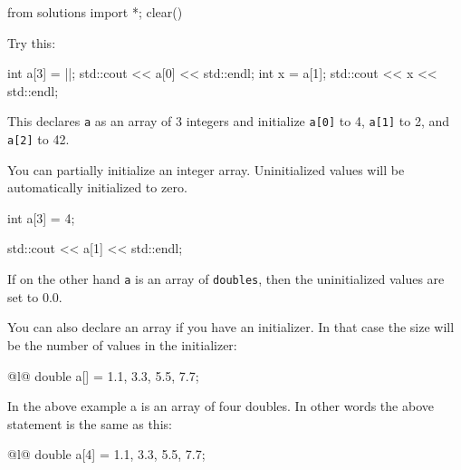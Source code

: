 \begin{python0}
from solutions import *; clear()
\end{python0}

Try this:

\begin{consolethree}[escapeinside=||]
int a[3] = ||;
std::cout << a[0] << std::endl;
int x = a[1];
std::cout << x << std::endl;  
\end{consolethree}

This declares \texttt{a} as an array of 3 integers and initialize \texttt{a[0]} to 4, \texttt{a[1]} to 2, and \texttt{a[2]} to 42.


You can partially initialize an integer array. Uninitialized values will be automatically initialized to zero.

\begin{consolethree}[escapeinside=||]
int a[3] = {4};

std::cout << a[1] << std::endl;
\end{consolethree}

If on the other hand \texttt{a} is an array of \texttt{doubles}, then the uninitialized values are set to 0.0.

You can also declare an array  if you have an initializer. In that case the size will be the number of values in the initializer:

\begin{consolethree}[escapeinside=||][]{@l@}
double a[] = {1.1, 3.3, 5.5, 7.7};  
\end{consolethree}

In the above example a is an array of four doubles. In other words the
above statement is the same as this:

\begin{consolethree}[escapeinside=||][]{@l@}
double a[4] = {1.1, 3.3, 5.5, 7.7};  
\end{consolethree}

